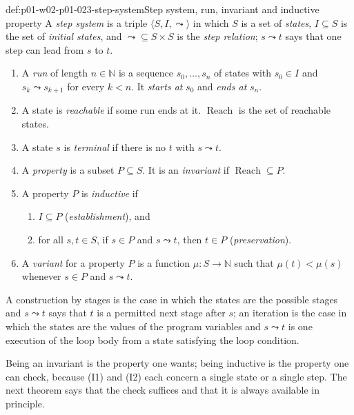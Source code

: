 \begin{hbdefinition}{def:p01-w02-p01-023-step-system}{Step system, run, invariant and inductive property}
A \emph{step system} is a triple \(\langle S,I,\leadsto\rangle\) in which
\(S\) is a set of \emph{states}, \(I\subseteq S\) is the set of
\emph{initial states}, and \({\leadsto}\subseteq S\times S\) is the
\emph{step relation}; \(s\leadsto t\) says that one step can lead from
\(s\) to \(t\).
\begin{enumerate}
  \item A \emph{run} of length \(n\in\mathbb N\) is a sequence
        \(s_0,\ldots,s_n\) of states with \(s_0\in I\) and
        \(s_k\leadsto s_{k+1}\) for every \(k<n\). It \emph{starts at}
        \(s_0\) and \emph{ends at} \(s_n\).
  \item A state is \emph{reachable} if some run ends at it.
        \(\operatorname{Reach}\) is the set of reachable states.
  \item A state \(s\) is \emph{terminal} if there is no \(t\) with
        \(s\leadsto t\).
  \item A \emph{property} is a subset \(P\subseteq S\). It is an
        \emph{invariant} if \(\operatorname{Reach}\subseteq P\).
  \item A property \(P\) is \emph{inductive} if
        \begin{enumerate}
          \item[(I1)] \(I\subseteq P\) (\emph{establishment}), and
          \item[(I2)] for all \(s,t\in S\), if \(s\in P\) and
                \(s\leadsto t\), then \(t\in P\) (\emph{preservation}).
        \end{enumerate}
  \item A \emph{variant} for a property \(P\) is a function
        \(\mu:S\to\mathbb N\) such that \(\mu(t)<\mu(s)\) whenever
        \(s\in P\) and \(s\leadsto t\).
\end{enumerate}
A construction by stages is the case in which the states are the possible
stages and \(s\leadsto t\) says that \(t\) is a permitted next stage after
\(s\); an iteration is the case in which the states are the values of the
program variables and \(s\leadsto t\) is one execution of the loop body
from a state satisfying the loop condition.
\end{hbdefinition}

Being an invariant is the property one wants; being inductive is the
property one can check, because (I1) and (I2) each concern a single state or
a single step. The next theorem says that the check suffices and that it is
always available in principle.


